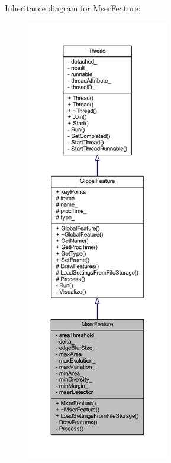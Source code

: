 Inheritance diagram for Mser\-Feature\-:
\nopagebreak
\begin{figure}[H]
\begin{center}
\leavevmode
\includegraphics[height=550pt]{class_mser_feature__inherit__graph}
\end{center}
\end{figure}


